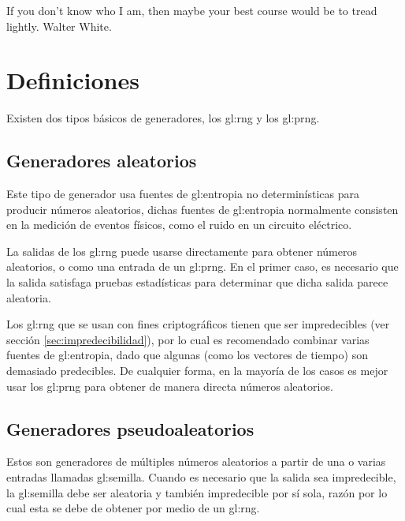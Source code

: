 %
%
%

{
  \epigrafe
  {%
    If you don't know who I am, then maybe your best course would be to
    tread lightly.%
  }
  {%
    Walter White.%
  }
}


\section{Definiciones} %

Existen dos tipos básicos de generadores, los \gls{gl:rng} y los \gls{gl:prng}.

\subsection{Generadores aleatorios} %

Este tipo de generador usa fuentes de \gls{gl:entropia} no determinísticas
para producir números aleatorios, dichas fuentes de \gls{gl:entropia}
normalmente consisten en la medición de eventos físicos, como el ruido
en un circuito eléctrico.

La salidas de los \gls{gl:rng} puede usarse directamente para obtener números
aleatorios, o como una entrada de un \gls{gl:prng}. En el primer caso, es
necesario que la salida satisfaga pruebas estadísticas para determinar que
dicha salida parece aleatoria.

Los \gls{gl:rng} que se usan con fines criptográficos tienen que ser
impredecibles (ver sección \ref{sec:impredecibilidad}), por lo cual es
recomendado combinar varias fuentes de \gls{gl:entropia}, dado que algunas
(como los vectores de tiempo) son demasiado predecibles. De cualquier forma,
en la mayoría de los casos es mejor usar los \gls{gl:prng} para obtener de
manera directa números aleatorios.

\subsection{Generadores pseudoaleatorios} %

Estos son generadores de múltiples números aleatorios a partir de una o varias
entradas llamadas \gls{gl:semilla}. Cuando es necesario que la salida sea
impredecible, la \gls{gl:semilla} debe ser aleatoria y también impredecible
por sí sola, razón por lo cual esta se debe de obtener por medio de un
\gls{gl:rng}.

